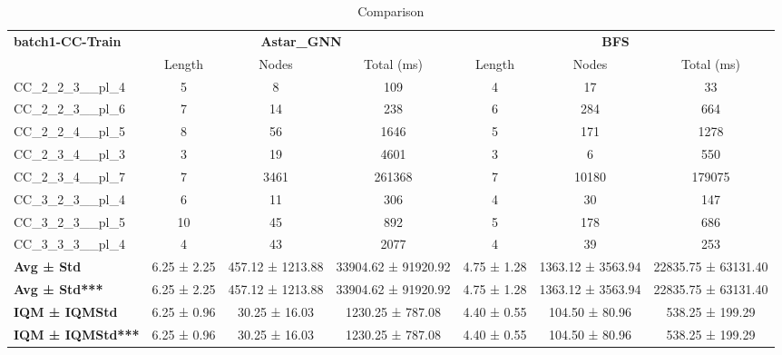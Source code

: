 \begin{table}[!ht]
\centering
\small
\begin{tabular}{l|ccc|ccc}
\multirow{2}{*}{\textbf{batch1-CC-Train}} & \multicolumn{3}{c|}{\textbf{Astar\_GNN}} & \multicolumn{3}{c}{\textbf{BFS}} \\
\cline{2-7}
& Length & Nodes & Total (ms) & Length & Nodes & Total (ms) \\
\hline
CC\_2\_2\_3\_\_pl\_4 & 5 & 8 & 109 & 4 & 17 & 33 \\
CC\_2\_2\_3\_\_pl\_6 & 7 & 14 & 238 & 6 & 284 & 664 \\
CC\_2\_2\_4\_\_pl\_5 & 8 & 56 & 1646 & 5 & 171 & 1278 \\
CC\_2\_3\_4\_\_pl\_3 & 3 & 19 & 4601 & 3 & 6 & 550 \\
CC\_2\_3\_4\_\_pl\_7 & 7 & 3461 & 261368 & 7 & 10180 & 179075 \\
CC\_3\_2\_3\_\_pl\_4 & 6 & 11 & 306 & 4 & 30 & 147 \\
CC\_3\_2\_3\_\_pl\_5 & 10 & 45 & 892 & 5 & 178 & 686 \\
CC\_3\_3\_3\_\_pl\_4 & 4 & 43 & 2077 & 4 & 39 & 253 \\
\hline
\textbf{Avg ± Std} & 6.25 ± 2.25 & 457.12 ± 1213.88 & 33904.62 ± 91920.92 & 4.75 ± 1.28 & 1363.12 ± 3563.94 & 22835.75 ± 63131.40 \\
\textbf{Avg ± Std***} & 6.25 ± 2.25 & 457.12 ± 1213.88 & 33904.62 ± 91920.92 & 4.75 ± 1.28 & 1363.12 ± 3563.94 & 22835.75 ± 63131.40 \\
\textbf{IQM ± IQMStd} & 6.25 ± 0.96 & 30.25 ± 16.03 & 1230.25 ± 787.08 & 4.40 ± 0.55 & 104.50 ± 80.96 & 538.25 ± 199.29 \\
\textbf{IQM ± IQMStd***} & 6.25 ± 0.96 & 30.25 ± 16.03 & 1230.25 ± 787.08 & 4.40 ± 0.55 & 104.50 ± 80.96 & 538.25 ± 199.29 \\
\end{tabular}
\caption{Comparison}
\label{tab:batch1_CC_comparison_train}
\end{table}
